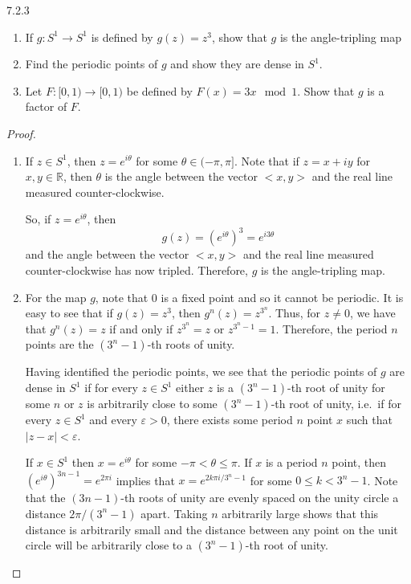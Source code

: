 \begin{problem}{7.2.3}
  \begin{enumerate}
    \item If $g: S^1 \to S^1$ is defined by $g(z) = z^3$, show that $g$ is the
      angle-tripling map
    \item Find the periodic points of $g$ and show they are dense in $S^1$.
    \item Let $F: [0, 1) \to [0, 1)$ be defined by $F(x) = 3x \mod 1$. Show
      that $g$ is a factor of $F$.
  \end{enumerate}
\end{problem}

\begin{proof}
  \begin{enumerate}
    \item If $z \in S^1$, then $z = e^{i \theta}$ for some $\theta \in (-\pi, \pi]$.
      Note that if $z = x + i y$ for $x, y \in \mathbb{R}$, then $\theta$ is
      the angle between the vector $<x, y>$ and the real line measured counter-clockwise.

      So, if $z = e^{i \theta}$, then
      $$g(z) = \left(e^{i\theta}\right)^3 = e^{i 3\theta}$$
      and the angle between the vector $<x, y>$ and the real line measured counter-clockwise
      has now tripled. Therefore, $g$ is the angle-tripling map.

    \item For the map $g$, note that $0$ is a fixed point and so it cannot be periodic. It is easy to see
      that if $g(z) = z^3$, then $g^n(z) = z^{3^n}$. Thus, for $z\neq 0$, we have that
      $g^n(z) = z$ if and only if $z^{3^n} = z$
      or $z^{3^n -1} = 1$. Therefore, the period $n$ points are the $(3^n-1)$-th roots
      of unity.

      Having identified the periodic points, we see that the periodic points of
      $g$ are dense in $S^1$ if for every $z \in S^1$ either $z$ is a $(3^n-1)$-th
      root of unity for some $n$ or $z$ is arbitrarily close to some $(3^n-1)$-th
      root of unity, i.e.\ if for every $z\in S^1$ and every $\varepsilon > 0$,
      there exists some period $n$ point $x$ such that $|z - x| < \varepsilon$.

      If $x \in S^1$ then $x = e^{i\theta}$ for some $-\pi < \theta \leq \pi$.
      If $x$ is a period $n$ point, then $\left(e^{i\theta}\right)^{3n-1} = e^{2\pi i}$ implies
      that $x = e^{2k\pi i / 3^n-1}$ for some $0 \leq k < 3^n-1$. Note that the $(3n-1)$-th roots of unity
      are evenly spaced on the unity circle a distance $2\pi / (3^n - 1)$ apart.
      Taking $n$ arbitrarily large shows that this distance is arbitrarily small and
      the distance between any point on the unit circle will be arbitrarily close to a $(3^n - 1)$-th root of unity.


\end{enumerate}
\end{proof}
